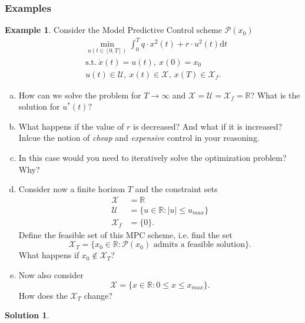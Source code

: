 \documentclass[a4paper,12 pt]{article}
\numberwithin{equation}{section}
\theoremstyle{definition}
\newtheorem{bsp}{Example}
\theoremstyle{remark}
\theoremstyle{definition}
\newtheorem*{lsg}{Solution}
\theoremstyle{definition}
\theoremstyle{definition}
\theoremstyle{remark}
\begin{document}
\subsubsection{Examples}
\begin{bsp}
Consider the Model Predictive Control scheme $\mathcal{P}(x_0)$
\begin{equation*}
\begin{split}
&\min_{u(t\in [0,T])}\int_0^T q\cdot x^2(t)+r\cdot u^2(t)\text{d}t\\
&\text{s.t.} \ \dot{x}(t)=u(t),\ x(0)=x_0\\
&u(t)\in \mathcal{U},\ x(t)\in \mathcal{X},\ x(T)\in \mathcal{X}_f.
\end{split}
\end{equation*}
\begin{enumerate}[(a)]
\item How can we solve the problem for $T\rightarrow \infty$ and $\mathcal{X}=\mathcal{U}=\mathcal{X}_f=\mathbb{R}$? What is the solution for $u^*(t)$?
\item What happens if the value of $r$ is decreased? And what if it is increased? Inlcue the notion of \textit{cheap} and \textit{expensive} control in your reasoning.
\item In this case would you need to iteratively solve the optimization problem? Why?
\item Consider now a finite horizon $T$ and the constraint sets
\begin{equation*}
\begin{split}
\mathcal{X}&=\mathbb{R}\\
\mathcal{U}&=\{ u\in \mathbb{R}: |u|\leq u_{max}\}\\
\mathcal{X}_f&=\{ 0\}.
\end{split}
\end{equation*}
Define the feasible set of this MPC scheme, i.e. find the set
\begin{equation*}
\mathcal{X}_T=\{ x_0\in \mathbb{R}:\mathcal{P}(x_0) \text{ admits a feasible solution}\}.
\end{equation*}
What happens if $x_0 \not \in \mathcal{X}_T$?
\item Now also consider 
\begin{equation*}
\mathcal{X}=\{x \in \mathbb{R}:0\leq x \leq x_{max} \}.
\end{equation*}
How does the $\mathcal{X}_T$ change?
\end{enumerate}
\newpage
\begin{lsg}
\
\begin{enumerate}[(a)]

\end{enumerate}
\end{lsg}
\end{bsp}
\end{document}
